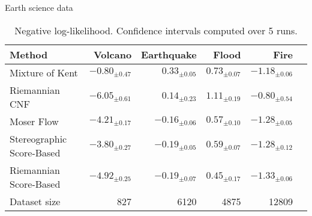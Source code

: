 \begin{frame}{Earth science data}
   \begin{table}[t]
       \centering
       \small
       \begin{tabular}{lrrrrr}
       \toprule
        Method & {Volcano} & {Earthquake} & {Flood} & {Fire} \\
       \midrule
       Mixture of Kent & $-0.80_{\pm 0.47}$ & $0.33_{\pm 0.05}$ & $0.73_{\pm 0.07}$ & $-1.18_{\pm 0.06}$ \\
   Riemannian CNF            &                      $\mathbf{-6.05_{\pm 0.61}}$ &                             ${0.14_{\pm 0.23}}$ &                            ${1.11_{\pm 0.19}}$ &                         $\mathbf{-0.80_{\pm 0.54}}$ \\
   Moser Flow                &                         ${-4.21_{\pm 0.17}}$ &                         $\mathbf{-0.16_{\pm 0.06}}$ &                         $\mathbf{0.57_{\pm 0.10}}$ &                         $\mathbf{-1.28_{\pm 0.05}}$ \\
   Stereographic Score-Based &  ${-3.80_{\pm 0.27}}$ &  $\mathbf{-0.19_{\pm 0.05}}$ &  $\mathbf{0.59_{\pm 0.07}}$ &  $\mathbf{-1.28_{\pm 0.12}}$ \\
   Riemannian Score-Based    &  ${-4.92_{\pm 0.25}}$ &  $\mathbf{-0.19_{\pm 0.07}}$ &  $\mathbf{0.45_{\pm 0.17}}$ &  $\mathbf{-1.33_{\pm 0.06}}$ \\
       \midrule 
       Dataset size & 827 & 6120 & 4875 & 12809 \\
       \bottomrule
       \end{tabular}
       \caption{
       Negative log-likelihood. 
       Confidence intervals computed over 5 runs.
       }
       \label{tab:geoscience}
       \vspace{-1.5em}
   \end{table}
   
   \end{frame}
   
